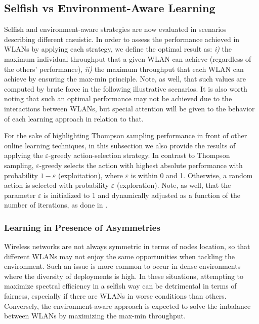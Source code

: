 \documentclass{article}
\begin{document}
\subsection{Selfish vs Environment-Aware Learning}
\label{subsection:selfish_vs_informed}  
Selfish and environment-aware strategies are now evaluated in scenarios describing different casuistic. In order to assess the performance achieved in WLANs by applying each strategy, we define the optimal result as: \emph{i)} the maximum individual throughput that a given WLAN can achieve (regardless of the others' performance), \emph{ii)} the maximum throughput that each WLAN can achieve by ensuring the max-min principle. Note, as well, that such values are computed by brute force in the following illustrative scenarios. It is also worth noting that such an optimal performance may not be achieved due to the interactions between WLANs, but special attention will be given to the behavior of each learning approach in relation to that.

For the sake of highlighting Thompson sampling performance in front of other online learning techniques, in this subsection we also provide the results of applying the $\varepsilon$-greedy action-selection strategy. In contrast to Thompson sampling, $\varepsilon$-greedy selects the action with highest absolute performance with probability $1-\varepsilon$ (exploitation), where $\varepsilon$ is within 0 and 1. Otherwise, a random action is selected with probability $\varepsilon$ (exploration). Note, as well, that the parameter $\varepsilon$ is initialized to 1 and dynamically adjusted as a function of the number of iterations, as done in \cite{auer2002finite}.

\subsubsection{Learning in Presence of Asymmetries}
\label{subsubsection:fairness}  	
Wireless networks are not always symmetric in terms of nodes location, so that different WLANs may not enjoy the same opportunities when tackling the environment. Such an issue is more common to occur in dense environments where the diversity of deployments is high. In these situations, attempting to maximize spectral efficiency in a selfish way can be detrimental in terms of fairness, especially if there are WLANs in worse conditions than others. Conversely, the environment-aware approach is expected to solve the imbalance between WLANs by maximizing the max-min throughput.
\end{document}

